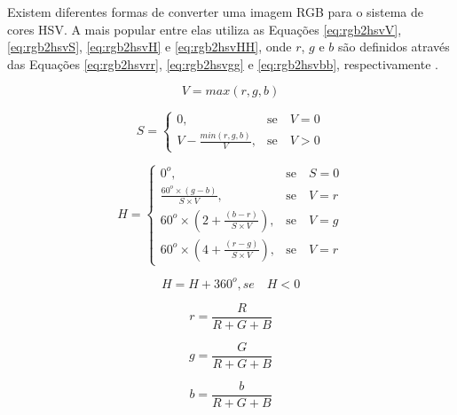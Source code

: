 \documentclass[	12pt, Times, openright, twoside, a4paper, english, brazil]{abntex2}
\begin{document}
Existem diferentes formas de converter uma imagem RGB para o sistema de cores HSV. A mais popular entre elas utiliza as Equações \ref{eq:rgb2hsvV}, \ref{eq:rgb2hsvS},  \ref{eq:rgb2hsvH} e \ref{eq:rgb2hsvHH}, onde $r$, $g$ e $b$ são definidos através das Equações \ref{eq:rgb2hsvrr}, \ref{eq:rgb2hsvgg} e \ref{eq:rgb2hsvbb}, respectivamente \cite{acharya2005image}.


\begin{equation}
\label{eq:rgb2hsvV}
V = max(r,g,b)
\end{equation}

\begin{equation}
\label{eq:rgb2hsvS}
S=\left\{
\begin{array}{rc}

    0,&\mbox{se}\quad V = 0 \\
    V - \frac{min(r,g,b)}{V},&\mbox{se}\quad V>0

\end{array}\right.
\end{equation}

\begin{equation}
\label{eq:rgb2hsvH}
H=\left\{
\begin{array}{rc}

    0^o,&\mbox{se}\quad S = 0 \\
    \frac{60^o \times (g-b)}{S \times V},&\mbox{se}\quad V=r \\
    60^o \times \left( 2 + \frac{(b-r)}{S \times V} \right),&\mbox{se}\quad V=g \\
    60^o \times \left( 4 + \frac{(r-g)}{S \times V} \right),&\mbox{se}\quad V=r

\end{array}\right.
\end{equation}

\begin{equation}
\label{eq:rgb2hsvHH}
    H=H+360^o, se \quad H < 0
\end{equation}

\begin{equation}
\label{eq:rgb2hsvrr}
    r = \frac{R}{R+G+B}
\end{equation}

\begin{equation}
\label{eq:rgb2hsvgg}
    g = \frac{G}{R+G+B}
\end{equation}

\begin{equation}
\label{eq:rgb2hsvbb}
    b = \frac{b}{R+G+B}
\end{equation}
\end{document}
